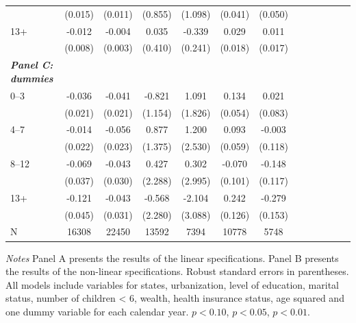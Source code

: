\documentclass[12pt,english]{article}
\begin{document}
\begin{table}[!ht]
\begin{center}
\begin{adjustbox}{max width=\linewidth}
\begin{threeparttable}
{\begin{tabular}{l*{6}{S S}}
						&  (0.015)         &  (0.011)         &  (0.855)         &  (1.098)         &  (0.041)         &  (0.050)         \\
						13+   &    -0.012         &   -0.004         &    0.035         &   -0.339         &    0.029         &    0.011         \\
						&  (0.008)         &  (0.003)         &  (0.410)         &  (0.241)         &  (0.018)         &  (0.017)         \\
						\textit{\textbf{Panel C: dummies}} &&&&&&\\
						0--3&   -0.036\sym{*}  &   -0.041\sym{**} &   -0.821         &    1.091         &    0.134\sym{**} &    0.021         \\
						&  (0.021)         &  (0.021)         &  (1.154)         &  (1.826)         &  (0.054)         &  (0.083)         \\
						4--7&   -0.014         &   -0.056\sym{**} &    0.877         &    1.200         &    0.093         &   -0.003         \\
						&  (0.022)         &  (0.023)         &  (1.375)         &  (2.530)         &  (0.059)         &  (0.118)         \\
						8--12 &  -0.069\sym{*}  &   -0.043         &    0.427         &    0.302         &   -0.070         &   -0.148         \\
						&  (0.037)         &  (0.030)         &  (2.288)         &  (2.995)         &  (0.101)         &  (0.117)         \\
						13+ &   -0.121\sym{***}&   -0.043         &   -0.568         &   -2.104         &    0.242\sym{*}  &   -0.279\sym{*}  \\
						&  (0.045)         &  (0.031)         &  (2.280)         &  (3.088)         &  (0.126)         &  (0.153)         \\
						\midrule
						N         &    16308         &    22450         &    13592         &     7394         &    10778         &     5748         \\
						\bottomrule
					\end{tabular}
					\begin{tablenotes}
						\item \footnotesize \textit{Notes} Panel A presents the results of the linear specifications. Panel B presents the results of the non-linear specifications. Robust standard errors in parentheses. All models include variables for  states, urbanization, level of education, marital status, number of children < 6, wealth, health insurance status, age squared and one dummy variable for each calendar year. \sym{*} \(p<0.10\), \sym{**} \(p<0.05\), \sym{***} \(p<0.01\).
					\end{tablenotes}
				}
			\end{threeparttable}
		\end{adjustbox}
	\end{center}
\end{table}
\end{document}
